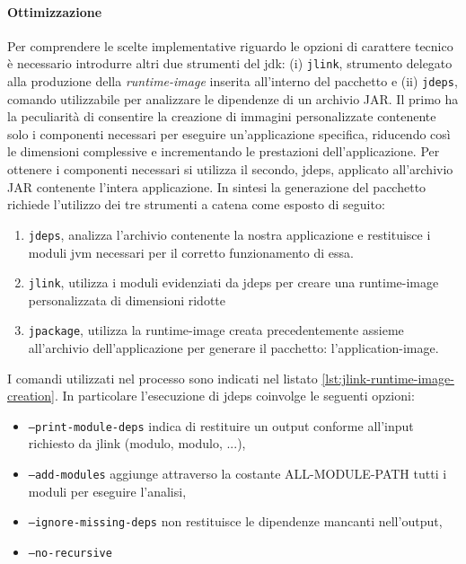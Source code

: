 \paragraph{Ottimizzazione} Per comprendere le scelte implementative riguardo le opzioni di carattere tecnico è necessario introdurre altri due strumenti del \ac{jdk}: (i) \texttt{jlink}, strumento delegato alla produzione della \textit{runtime-image} inserita all'interno del pacchetto e (ii) \texttt{jdeps}, comando utilizzabile per analizzare le dipendenze di un archivio JAR. Il primo ha la peculiarità di consentire la creazione di immagini personalizzate contenente solo i componenti necessari per eseguire un'applicazione specifica, riducendo così le dimensioni complessive e incrementando le prestazioni dell'applicazione. Per ottenere i componenti necessari si utilizza il secondo, jdeps, applicato all'archivio JAR contenente l'intera applicazione. In sintesi la generazione del pacchetto richiede l'utilizzo dei tre strumenti a catena come esposto di seguito:
\begin{enumerate}
	\item \texttt{jdeps}, analizza l'archivio contenente la nostra applicazione e restituisce i moduli jvm necessari per il corretto funzionamento di essa.
	\item \texttt{jlink}, utilizza i moduli evidenziati da jdeps per creare una runtime-image personalizzata di dimensioni ridotte
	\item \texttt{jpackage}, utilizza la runtime-image creata precedentemente assieme all'ar\-chi\-vio dell'applicazione per generare il pacchetto: l'application-image.
\end{enumerate}



I comandi utilizzati nel processo sono indicati nel listato \ref{lst:jlink-runtime-image-creation}. In particolare l'esecuzione di jdeps coinvolge le seguenti opzioni:
\begin{itemize}
	\item \texttt{--print-module-deps} indica di restituire un output conforme all'input ri\-chie\-sto da jlink (modulo, modulo, ...),
	\item \texttt{--add-modules} aggiunge attraverso la costante ALL-MODULE-PATH tutti i moduli per eseguire l'analisi,
	\item \texttt{--ignore-missing-deps} non restituisce le dipendenze mancanti nell'output,
	\item \texttt{--no-recursive} 
\end{itemize}

